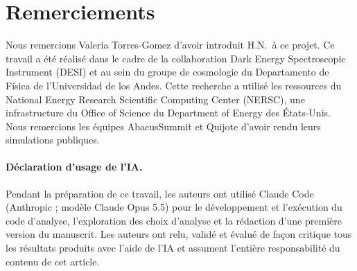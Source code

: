 \section*{Remerciements}

Nous remercions Valeria Torres-Gomez d'avoir introduit H.N.\ à ce projet. Ce travail a été réalisé dans le cadre de la collaboration Dark Energy Spectroscopic Instrument (DESI) et au sein du groupe de cosmologie du Departamento de Física de l'Universidad de los Andes. Cette recherche a utilisé les ressources du National Energy Research Scientific Computing Center (NERSC), une infrastructure du Office of Science du Department of Energy des États-Unis. Nous remercions les équipes AbacusSummit et Quijote d'avoir rendu leurs simulations publiques.

\paragraph{Déclaration d'usage de l'IA.} Pendant la préparation de ce travail, les auteurs ont utilisé Claude Code (Anthropic ; modèle Claude Opus 5.5) pour le développement et l'exécution du code d'analyse, l'exploration des choix d'analyse et la rédaction d'une première version du manuscrit. Les auteurs ont relu, validé et évalué de façon critique tous les résultats produits avec l'aide de l'IA et assument l'entière responsabilité du contenu de cet article.
